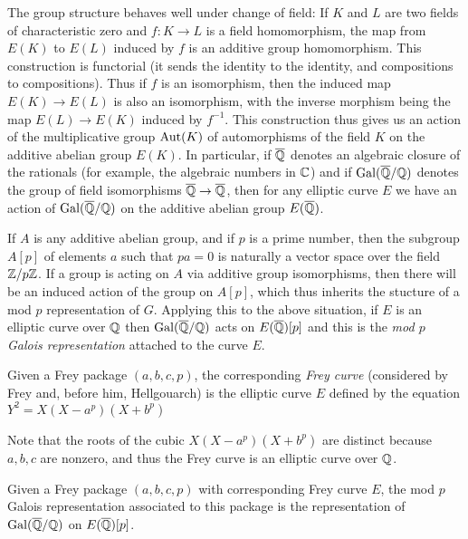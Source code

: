 The group structure behaves well under change of field: If $K$ and $L$ are two fields of characteristic zero and $f:K\to L$ is a field homomorphism, the map from $E(K)$ to $E(L)$ induced by $f$ is an additive group homomorphism. This construction is functorial (it sends the identity to the identity,
and compositions to compositions). Thus if $f$ is an isomorphism, then the induced map $E(K)\to E(L)$ is
also an isomorphism, with the inverse morphism being the map $E(L)\to E(K)$ induced by $f^{-1}$. This construction
thus gives us an action of the multiplicative group $\operatorname{Aut}(K)$ of automorphisms of the field
$K$ on the additive abelian group $E(K)$. In particular, if $\overline{\mathbb{Q}}$ denotes an algebraic closure of the rationals (for example, the algebraic numbers in $\mathbb{C}$) and if $\operatorname{Gal}(\overline{\mathbb{Q}}/\mathbb{Q})$ denotes the group of field isomorphisms $\overline{\mathbb{Q}}\to\overline{\mathbb{Q}}$, then for any elliptic curve $E$ we have an action of $\operatorname{Gal}(\overline{\mathbb{Q}}/\mathbb{Q})$ on the additive abelian group $E(\overline{\mathbb{Q}})$.

If $A$ is any additive abelian group, and if $p$ is a prime number, then the subgroup $A[p]$ of elements $a$ such that $pa=0$ is naturally a vector space over the field $\mathbb{Z}/p\mathbb{Z}$. If a group is acting on $A$ via additive group isomorphisms, then there will be an induced action of the group on $A[p]$, which thus inherits the stucture of a mod $p$ representation of $G$. Applying this to the above situation,
if $E$ is an elliptic curve over $\mathbb{Q}$ then $\operatorname{Gal}(\overline{\mathbb{Q}}/\mathbb{Q})$ acts on $E(\overline{\mathbb{Q}})[p]$ and this is the \emph{mod $p$ Galois representation} attached to
the curve $E$.

\begin{definition}[Frey]\label{Frey_curve} Given a Frey package $(a,b,c,p)$, the corresponding \emph{Frey curve} (considered by Frey and, before him, Hellgouarch) is the elliptic curve $E$ defined by the equation $Y^2=X(X-a^p)(X+b^p)$\end{definition}

Note that the roots of the cubic $X(X-a^p)(X+b^p)$ are distinct because $a,b,c$ are nonzero, and thus the Frey curve is an
elliptic curve over $\mathbb{Q}$.

\begin{definition}\label{Frey_mod_p_Galois_representation} Given a Frey package $(a,b,c,p)$ with corresponding Frey curve $E$, the mod $p$ Galois representation associated
  to this package is the representation of $\operatorname{Gal}(\overline{\mathbb{Q}}/\mathbb{Q})$ on $E(\overline{\mathbb{Q}})[p]$.\end{definition}

